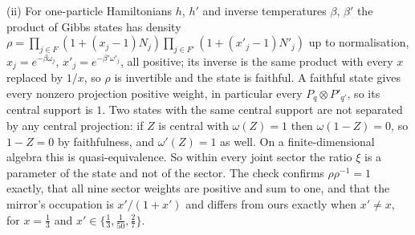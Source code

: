(ii) For one-particle Hamiltonians $h$, $h'$ and inverse temperatures $\beta$, $\beta'$ the product of Gibbs states has density $\rho = \prod_{j \in F}(1 + (x_{j} - 1)N_{j}) \prod_{j \in F'}(1 + (x'_{j} - 1)N'_{j})$ up to normalisation, $x_{j} = e^{-\beta\omega_{j}}$, $x'_{j} = e^{-\beta'\omega'_{j}}$, all positive; its inverse is the same product with every $x$ replaced by $1/x$, so $\rho$ is invertible and the state is faithful. A faithful state gives every nonzero projection positive weight, in particular every $P_{q} \otimes P'_{q'}$, so its central support is $1$. Two states with the same central support are not separated by any central projection: if $Z$ is central with $\omega(Z) = 1$ then $\omega(1 - Z) = 0$, so $1 - Z = 0$ by faithfulness, and $\omega'(Z) = 1$ as well. On a finite-dimensional algebra this is quasi-equivalence. So within every joint sector the ratio $\xi$ is a parameter of the state and not of the sector. The check confirms $\rho\rho^{-1} = 1$ exactly, that all nine sector weights are positive and sum to one, and that the mirror's occupation is $x'/(1 + x')$ and differs from ours exactly when $x' \neq x$, for $x = \tfrac13$ and $x' \in \{\tfrac13, \tfrac{1}{50}, \tfrac27\}$.

